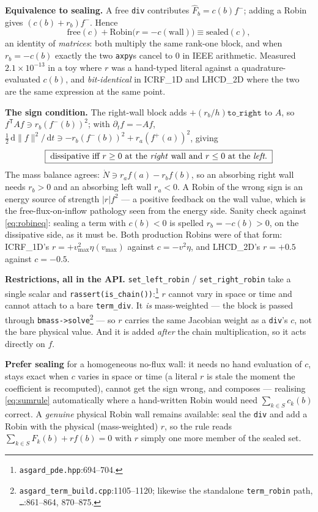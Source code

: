 \documentclass[10pt]{article}
\newcommand{\code}[1]{\texttt{#1}}
\newcommand{\dd}{\,\mathrm{d}}
\newcommand{\hF}{\widehat{F}}
\newcommand{\fl}[2]{\texttt{#1}:#2}
\begin{document}
\textbf{Equivalence to sealing.} A free \code{div} contributes $\hF_b=c(b)f^-$;
adding a Robin gives $(c(b)+r_b)f^-$. Hence
\begin{equation}
  \boxed{\ \text{free}(c) + \text{Robin}\big(r=-c(\text{wall})\big) \equiv
          \text{sealed}(c),\ }
  \label{eq:robineq}
\end{equation}
an identity of \emph{matrices}: both multiply the same rank-one block, and when
$r_b=-c(b)$ exactly the two \code{axpy}s cancel to $0$ in IEEE arithmetic.
Measured $2.1\times10^{-13}$ in a toy where $r$ was a hand-typed literal against a
quadrature-evaluated $c(b)$, and \emph{bit-identical} in ICRF\_1D and LHCD\_2D
where the two are the same expression at the same point.

\textbf{The sign condition.} The right-wall block adds
$+(r_b/h)\code{to\_right}$ to $A$, so $f^{\mathsf T}\!Af\ni r_b(f^-(b))^2$; with
$\partial_tf=-Af$,
$\tfrac12\dd\|f\|^2/\dd t \ni -r_b(f^-(b))^2 + r_a(f^+(a))^2$, giving
\begin{equation}
\boxed{\;\text{dissipative iff } r \ge 0 \text{ at the \emph{right} wall and }
r \le 0 \text{ at the \emph{left}.}\;}
\label{eq:robinsign}
\end{equation}
The mass balance agrees: $\dot N\ni r_af(a)-r_bf(b)$, so an absorbing right wall
needs $r_b>0$ and an absorbing left wall $r_a<0$. A Robin of the wrong sign is an
energy source of strength $|r|f^2$ --- a positive feedback on the wall value,
which is the free-flux-on-inflow pathology seen from the energy side. Sanity
check against \eqref{eq:robineq}: sealing a term with $c(b)<0$ is spelled
$r_b=-c(b)>0$, on the dissipative side, as it must be. Both production Robins
were of that form: ICRF\_1D's $r=+v_{\max}^2\eta(v_{\max})$ against
$c=-v^2\eta$, and LHCD\_2D's $r=+0.5$ against $c=-0.5$.

\textbf{Restrictions, all in the API.} \code{set\_left\_robin} /
\code{set\_right\_robin} take a single scalar and
\code{rassert(is\_chain())}:\footnote{\fl{asgard\_pde.hpp}{694--704}.} $r$ cannot
vary in space or time and cannot attach to a bare \code{term\_div}. It \emph{is}
mass-weighted --- the block is passed through
\code{bmass->solve}\footnote{\fl{asgard\_term\_build.cpp}{1105--1120}; likewise
the standalone \code{term\_robin} path, \fl{\dots}{861--864, 870--875}.} --- so
$r$ carries the same Jacobian weight as a \code{div}'s $c$, not the bare physical
value. And it is added \emph{after} the chain multiplication, so it acts directly
on $f$.

\textbf{Prefer sealing} for a homogeneous no-flux wall: it needs no hand
evaluation of $c$, stays exact when $c$ varies in space or time (a literal $r$ is
stale the moment the coefficient is recomputed), cannot get the sign wrong, and
composes --- realising \eqref{eq:sumrule} automatically where a hand-written
Robin would need $\sum_{k\in S}c_k(b)$ correct. A \emph{genuine} physical Robin
wall remains available: seal the \code{div} and add a Robin with the physical
(mass-weighted) $r$, so the rule reads $\sum_{k\in S}F_k(b)+rf(b)=0$ with $r$
simply one more member of the sealed set.
\end{document}
